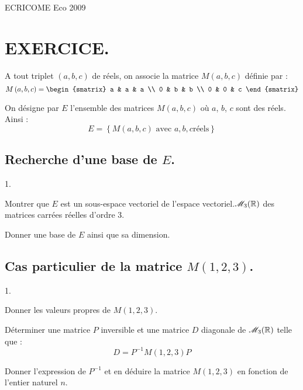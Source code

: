 \documentclass[11pt]{article}%
\begin{document}
\begin{center}
{\Huge ECRICOME Eco 2009}
\end{center}

\section{EXERCICE.}

A tout triplet $\left( a,b,c\right) $ de réels, on associe la matrice
$M\left( a,b,c\right) $ définie par :
\[
M\left( a,b,c\right) = 
\begin{smatrix}
a & a & a \\
0 & b & b \\
0 & 0 & c
\end{smatrix}
\]

On désigne par $E$ l'ensemble des matrices $M\left( a,b,c\right) $ où
$a$, $b$, $c$ sont des réels. Ainsi : 
\[
E = \left\{ M\left( a,b,c\right) \text{ avec }a,b,c\text{
réels}\right\} 
\]

\subsection{Recherche d'une base de $E$.}

\begin{noliste}{1.}
 \setlength{\itemsep}{4mm}
\item Montrer que $E$ est un sous-espace vectoriel de l'espace
vectoriel.$\mathscr{M}_{3}(\mathbb{R}) $ des matrices carrées réelles d'ordre 3.

\item Donner une base de $E$ ainsi que sa dimension.
\end{noliste}

\subsection{Cas particulier de la matrice $M\left( 1,2,3\right) $.}

\begin{noliste}{1.}
 \setlength{\itemsep}{4mm}
\item Donner les valeurs propres de $M\left( 1,2,3\right) $.

\item Déterminer une matrice $P$ inversible et une matrice $D$
diagonale
de $\mathscr{M}_{3}(\mathbb{R}) $ telle que :
\[
D = P^{-1}M\left( 1,2,3\right) P
\]

\item Donner l'expression de $P^{-1}$ et en déduire la matrice $M\left(
1,2,3\right) $ en fonction de l'entier naturel $n$.
\end{noliste}
\end{document}
